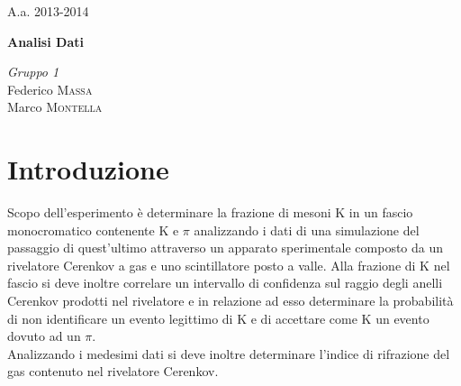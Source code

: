 \documentclass[8pt]{extarticle}
\begin{document}
\justify
\printindex
\Large{A.a. 2013-2014}
\vspace{10cm}
\begin{center}
\Huge\textbf{Analisi Dati}
\end{center}

\vspace{2cm}
\begin{flushleft}
\textit{Gruppo \textsc{1}} \\
\medskip
Federico \textsc{Massa} \\ 
Marco \textsc{Montella}
\end{flushleft}



\newpage

\begin{abstract}
\justify
 

\end{abstract}
\bigskip

\section{Introduzione} \label{sec:intro}
Scopo dell'esperimento è determinare la frazione di mesoni K in un fascio monocromatico contenente K e $\pi$ analizzando i dati di una simulazione del passaggio di quest'ultimo attraverso un apparato sperimentale composto da un rivelatore Cerenkov a gas e uno scintillatore posto a valle. Alla frazione di K nel fascio si deve inoltre correlare un intervallo di confidenza sul raggio degli anelli Cerenkov prodotti nel rivelatore e in relazione ad esso determinare la probabilità di non identificare un evento legittimo di K e di accettare come K un evento dovuto ad un $\pi$. \\
Analizzando i medesimi dati si deve inoltre determinare l'indice di rifrazione del gas contenuto nel rivelatore Cerenkov. \\
\end{document}
